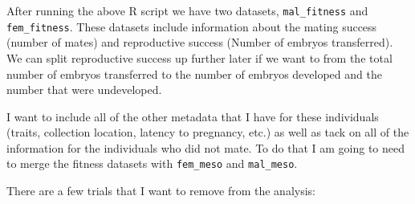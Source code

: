 \documentclass[
]{article}
\newenvironment{Shaded}{\begin{snugshade}}{\end{snugshade}}
\newcommand{\AttributeTok}[1]{\textcolor[rgb]{0.13,0.29,0.53}{#1}}
\newcommand{\CommentTok}[1]{\textcolor[rgb]{0.56,0.35,0.01}{\textit{#1}}}
\newcommand{\ConstantTok}[1]{\textcolor[rgb]{0.56,0.35,0.01}{#1}}
\newcommand{\FunctionTok}[1]{\textcolor[rgb]{0.13,0.29,0.53}{\textbf{#1}}}
\newcommand{\NormalTok}[1]{#1}
\newcommand{\OtherTok}[1]{\textcolor[rgb]{0.56,0.35,0.01}{#1}}
\newcommand{\SpecialCharTok}[1]{\textcolor[rgb]{0.81,0.36,0.00}{\textbf{#1}}}
\newcommand{\StringTok}[1]{\textcolor[rgb]{0.31,0.60,0.02}{#1}}
\begin{document}
After running the above R script we have two datasets, \texttt{mal\_fitness} and \texttt{fem\_fitness}. These datasets include information about the mating success (number of mates) and reproductive success (Number of embryos transferred). We can split reproductive success up further later if we want to from the total number of embryos transferred to the number of embryos developed and the number that were undeveloped.

I want to include all of the other metadata that I have for these individuals (traits, collection location, latency to pregnancy, etc.) as well as tack on all of the information for the individuals who did not mate. To do that I am going to need to merge the fitness datasets with \texttt{fem\_meso} and \texttt{mal\_meso}.

\begin{Shaded}
\end{Shaded}

There are a few trials that I want to remove from the analysis:
\end{document}
